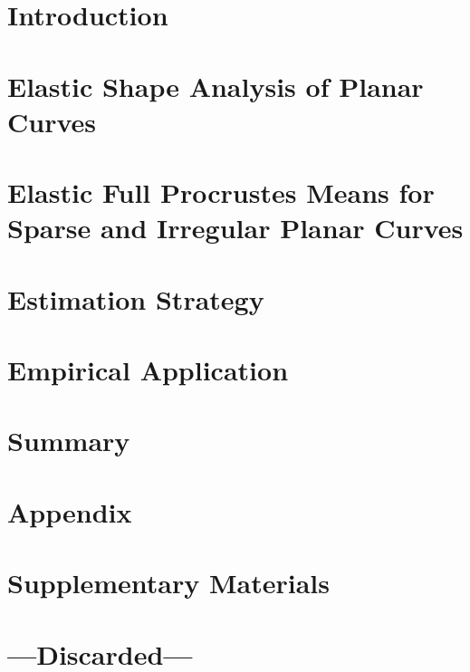 \documentclass[a4paper,12pt,english,headings=small]{scrreprt}
\begin{document}
\tableofcontents



\newpage
{}
\chapter{Introduction}
\label{sec:intro}


\newpage
\chapter{Elastic Shape Analysis of Planar Curves}
\label{sec:theo}


\newpage
\chapter{Elastic Full Procrustes Means for Sparse and Irregular Planar Curves}
\label{sec:mean}


\newpage
\chapter{Estimation Strategy}
\label{sec:algo}


\newpage
\chapter{Empirical Application}
\label{sec:app}


\newpage
\chapter{Summary}
\label{sec:sum}



\newpage
\nocite{*}
\printbibliography[heading=bibintoc] %



\newpage
\appendix
{}
\chapter{Appendix}
\label{app:deriv}


\newpage
\chapter{Supplementary Materials}
\label{app:deriv}


\newpage
\chapter{---Discarded---}

\end{document}
